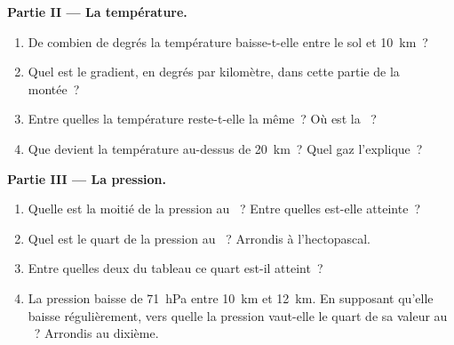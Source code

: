 \begin{problem}
\noindent\textbf{Partie II --- La température.}\par\nopagebreak
\begin{enumerate}[resume, beginpenalty=10000]
  \item De combien de degrés la température baisse-t-elle entre le sol et
        \qty{10}{km}~?
  \item Quel est le gradient, en degrés par kilomètre, dans cette partie
        de la montée~?
  \item Entre quelles  la température reste-t-elle la même~? Où
        est la ~?
  \item Que devient la température au-dessus de \qty{20}{km}~? Quel gaz
        l'explique~?
\end{enumerate}

\noindent\textbf{Partie III --- La pression.}\par\nopagebreak
\begin{enumerate}[resume, beginpenalty=10000]
  \item Quelle est la moitié de la pression au ~? Entre
        quelles  est-elle atteinte~?
  \item Quel est le quart de la pression au ~? Arrondis à
        l'hectopascal.
  \item Entre quelles deux  du tableau ce quart est-il atteint~?
  \item La pression baisse de \qty{71}{hPa} entre \qty{10}{km} et
        \qty{12}{km}. En supposant qu'elle baisse régulièrement, vers quelle
         la pression vaut-elle le quart de sa valeur au ~? Arrondis au dixième.
\end{enumerate}
\end{problem}
